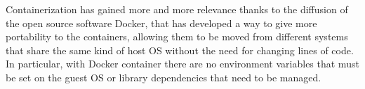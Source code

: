 Containerization has gained more and more relevance thanks to the diffusion of the open source software Docker, that has developed a way to give more portability to the containers, allowing them to be moved from different systems that share the same kind of host OS without the need for changing lines of code. In particular, with Docker container there are no environment variables that must be set on the guest OS or library dependencies that need to be managed.







